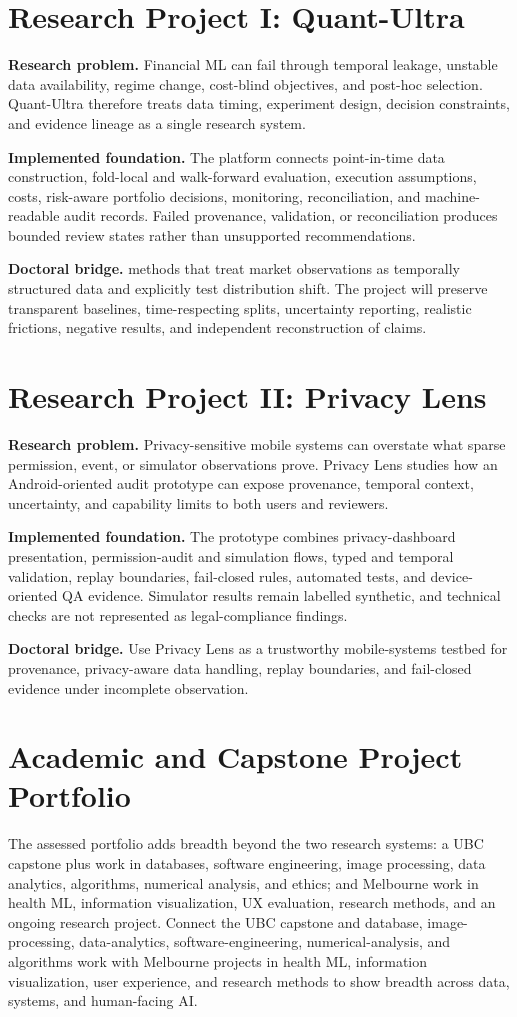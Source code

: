 \documentclass[11pt]{article}
\begin{document}
\section*{Research Project I: Quant-Ultra}
\textbf{Research problem.} Financial ML can fail through temporal leakage, unstable data availability, regime change, cost-blind objectives, and post-hoc selection. Quant-Ultra therefore treats data timing, experiment design, decision constraints, and evidence lineage as a single research system.

\textbf{Implemented foundation.} The platform connects point-in-time data construction, fold-local and walk-forward evaluation, execution assumptions, costs, risk-aware portfolio decisions, monitoring, reconciliation, and machine-readable audit records. Failed provenance, validation, or reconciliation produces bounded review states rather than unsupported recommendations.

\textbf{Doctoral bridge.} methods that treat market observations as temporally structured data and explicitly test distribution shift. The project will preserve transparent baselines, time-respecting splits, uncertainty reporting, realistic frictions, negative results, and independent reconstruction of claims.

\section*{Research Project II: Privacy Lens}
\textbf{Research problem.} Privacy-sensitive mobile systems can overstate what sparse permission, event, or simulator observations prove. Privacy Lens studies how an Android-oriented audit prototype can expose provenance, temporal context, uncertainty, and capability limits to both users and reviewers.

\textbf{Implemented foundation.} The prototype combines privacy-dashboard presentation, permission-audit and simulation flows, typed and temporal validation, replay boundaries, fail-closed rules, automated tests, and device-oriented QA evidence. Simulator results remain labelled synthetic, and technical checks are not represented as legal-compliance findings.

\textbf{Doctoral bridge.} Use Privacy Lens as a trustworthy mobile-systems testbed for provenance, privacy-aware data handling, replay boundaries, and fail-closed evidence under incomplete observation.

\section*{Academic and Capstone Project Portfolio}
The assessed portfolio adds breadth beyond the two research systems: a UBC capstone plus work in databases, software engineering, image processing, data analytics, algorithms, numerical analysis, and ethics; and Melbourne work in health ML, information visualization, UX evaluation, research methods, and an ongoing research project. Connect the UBC capstone and database, image-processing, data-analytics, software-engineering, numerical-analysis, and algorithms work with Melbourne projects in health ML, information visualization, user experience, and research methods to show breadth across data, systems, and human-facing AI.
\end{document}
